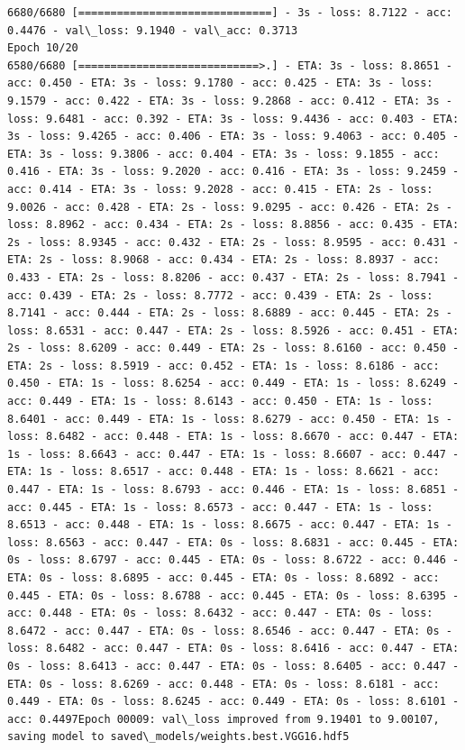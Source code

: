 \documentclass[11pt]{article}
\begin{document}
\begin{Verbatim}[commandchars=\\\{\}]
6680/6680 [==============================] - 3s - loss: 8.7122 - acc: 0.4476 - val\_loss: 9.1940 - val\_acc: 0.3713
Epoch 10/20
6580/6680 [============================>.] - ETA: 3s - loss: 8.8651 - acc: 0.450 - ETA: 3s - loss: 9.1780 - acc: 0.425 - ETA: 3s - loss: 9.1579 - acc: 0.422 - ETA: 3s - loss: 9.2868 - acc: 0.412 - ETA: 3s - loss: 9.6481 - acc: 0.392 - ETA: 3s - loss: 9.4436 - acc: 0.403 - ETA: 3s - loss: 9.4265 - acc: 0.406 - ETA: 3s - loss: 9.4063 - acc: 0.405 - ETA: 3s - loss: 9.3806 - acc: 0.404 - ETA: 3s - loss: 9.1855 - acc: 0.416 - ETA: 3s - loss: 9.2020 - acc: 0.416 - ETA: 3s - loss: 9.2459 - acc: 0.414 - ETA: 3s - loss: 9.2028 - acc: 0.415 - ETA: 2s - loss: 9.0026 - acc: 0.428 - ETA: 2s - loss: 9.0295 - acc: 0.426 - ETA: 2s - loss: 8.8962 - acc: 0.434 - ETA: 2s - loss: 8.8856 - acc: 0.435 - ETA: 2s - loss: 8.9345 - acc: 0.432 - ETA: 2s - loss: 8.9595 - acc: 0.431 - ETA: 2s - loss: 8.9068 - acc: 0.434 - ETA: 2s - loss: 8.8937 - acc: 0.433 - ETA: 2s - loss: 8.8206 - acc: 0.437 - ETA: 2s - loss: 8.7941 - acc: 0.439 - ETA: 2s - loss: 8.7772 - acc: 0.439 - ETA: 2s - loss: 8.7141 - acc: 0.444 - ETA: 2s - loss: 8.6889 - acc: 0.445 - ETA: 2s - loss: 8.6531 - acc: 0.447 - ETA: 2s - loss: 8.5926 - acc: 0.451 - ETA: 2s - loss: 8.6209 - acc: 0.449 - ETA: 2s - loss: 8.6160 - acc: 0.450 - ETA: 2s - loss: 8.5919 - acc: 0.452 - ETA: 1s - loss: 8.6186 - acc: 0.450 - ETA: 1s - loss: 8.6254 - acc: 0.449 - ETA: 1s - loss: 8.6249 - acc: 0.449 - ETA: 1s - loss: 8.6143 - acc: 0.450 - ETA: 1s - loss: 8.6401 - acc: 0.449 - ETA: 1s - loss: 8.6279 - acc: 0.450 - ETA: 1s - loss: 8.6482 - acc: 0.448 - ETA: 1s - loss: 8.6670 - acc: 0.447 - ETA: 1s - loss: 8.6643 - acc: 0.447 - ETA: 1s - loss: 8.6607 - acc: 0.447 - ETA: 1s - loss: 8.6517 - acc: 0.448 - ETA: 1s - loss: 8.6621 - acc: 0.447 - ETA: 1s - loss: 8.6793 - acc: 0.446 - ETA: 1s - loss: 8.6851 - acc: 0.445 - ETA: 1s - loss: 8.6573 - acc: 0.447 - ETA: 1s - loss: 8.6513 - acc: 0.448 - ETA: 1s - loss: 8.6675 - acc: 0.447 - ETA: 1s - loss: 8.6563 - acc: 0.447 - ETA: 0s - loss: 8.6831 - acc: 0.445 - ETA: 0s - loss: 8.6797 - acc: 0.445 - ETA: 0s - loss: 8.6722 - acc: 0.446 - ETA: 0s - loss: 8.6895 - acc: 0.445 - ETA: 0s - loss: 8.6892 - acc: 0.445 - ETA: 0s - loss: 8.6788 - acc: 0.445 - ETA: 0s - loss: 8.6395 - acc: 0.448 - ETA: 0s - loss: 8.6432 - acc: 0.447 - ETA: 0s - loss: 8.6472 - acc: 0.447 - ETA: 0s - loss: 8.6546 - acc: 0.447 - ETA: 0s - loss: 8.6482 - acc: 0.447 - ETA: 0s - loss: 8.6416 - acc: 0.447 - ETA: 0s - loss: 8.6413 - acc: 0.447 - ETA: 0s - loss: 8.6405 - acc: 0.447 - ETA: 0s - loss: 8.6269 - acc: 0.448 - ETA: 0s - loss: 8.6181 - acc: 0.449 - ETA: 0s - loss: 8.6245 - acc: 0.449 - ETA: 0s - loss: 8.6101 - acc: 0.4497Epoch 00009: val\_loss improved from 9.19401 to 9.00107, saving model to saved\_models/weights.best.VGG16.hdf5

\end{Verbatim}
\end{document}
